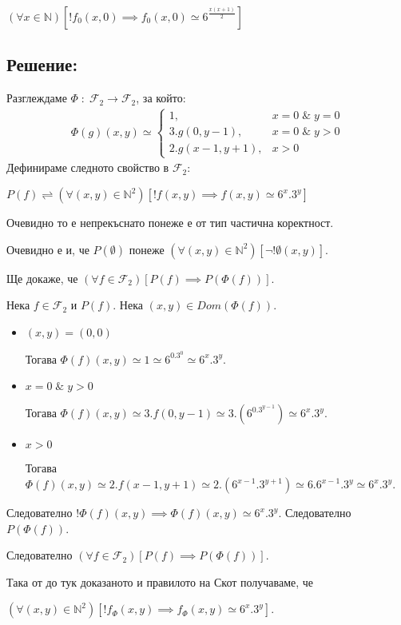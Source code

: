 \documentclass{article}
\begin{document}
\((\forall x \in \mathbb{N})[!f_0(x, 0) \implies f_0(x, 0) \simeq 6^{\displaystyle\frac{x(x + 1)}{2}}]\)
\subsection*{Решение:}
Разглеждаме \(\Phi \; : \; \mathcal{F}_2 \to \mathcal{F}_2\), за който:
\begin{align*}
\Phi(g)(x, y) \simeq \begin{cases}
    1, & x = 0 \; \& \; y = 0 \\
    3.g(0, y - 1), & x = 0 \; \& \; y > 0 \\
    2.g(x - 1, y + 1), & x > 0
\end{cases}    
\end{align*}
Дефинираме следното свойство в \(\mathcal{F}_2\):

\(P(f) \rightleftharpoons (\forall (x, y) \in \mathbb{N}^2)[!f(x, y) \implies f(x, y) \simeq 6^x.3^y]\)

Очевидно то е непрекъснато понеже е от тип частична коректност.

Очевидно е и, че \(P(\emptyset)\) понеже \((\forall (x, y) \in \mathbb{N}^2)[\lnot!\emptyset(x, y)]\).

Ще докаже, че \((\forall f \in \mathcal{F}_2)[P(f) \implies P(\Phi(f))]\).

Нека \(f \in \mathcal{F}_2\) и \(P(f)\). Нека \((x, y) \in Dom(\Phi(f))\).
\begin{itemize}
\item \((x, y) = (0, 0)\)

Тогава \(\Phi(f)(x, y) \simeq 1 \simeq 6^0.3^0 \simeq 6^x.3^y\).
\item \(x = 0 \; \& \; y > 0\)

Тогава \(\Phi(f)(x, y) \simeq 3.f(0, y - 1) \simeq 3.(6^0.3^{y - 1}) \simeq 6^x.3^y\).

\item \(x > 0\)

Тогава \(\Phi(f)(x, y) \simeq 2.f(x - 1, y + 1) \simeq 2.(6^{x - 1}.3^{y + 1}) \simeq 6.6^{x - 1}.3^y \simeq 6^x.3^y\).
\end{itemize}
Следователно \(!\Phi(f)(x, y) \implies \Phi(f)(x, y) \simeq 6^x.3^y\).
Следователно \(P(\Phi(f))\).

Следователно \((\forall f \in \mathcal{F}_2)[P(f) \implies P(\Phi(f))]\).

Така от до тук доказаното и правилото на Скот получаваме, че

\((\forall (x, y) \in \mathbb{N}^2)[!f_\Phi(x, y) \implies f_\Phi(x, y) \simeq 6^x.3^y]\).
\end{document}

